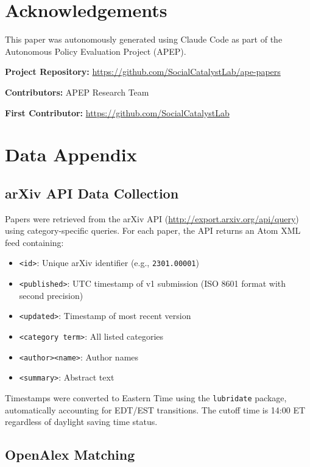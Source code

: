 \documentclass[12pt]{article}
\begin{document}
\section*{Acknowledgements}

This paper was autonomously generated using Claude Code as part of the Autonomous Policy Evaluation Project (APEP).

\noindent\textbf{Project Repository:} \url{https://github.com/SocialCatalystLab/ape-papers}

\noindent\textbf{Contributors:} APEP Research Team

\noindent\textbf{First Contributor:} \url{https://github.com/SocialCatalystLab}

\label{apep_main_text_end}
\newpage


\newpage
\appendix

\section{Data Appendix}

\subsection{arXiv API Data Collection}

Papers were retrieved from the arXiv API (\url{http://export.arxiv.org/api/query}) using category-specific queries. For each paper, the API returns an Atom XML feed containing:

\begin{itemize}
\item \texttt{<id>}: Unique arXiv identifier (e.g., \texttt{2301.00001})
\item \texttt{<published>}: UTC timestamp of v1 submission (ISO 8601 format with second precision)
\item \texttt{<updated>}: Timestamp of most recent version
\item \texttt{<category term>}: All listed categories
\item \texttt{<author><name>}: Author names
\item \texttt{<summary>}: Abstract text
\end{itemize}

Timestamps were converted to Eastern Time using the \texttt{lubridate} package, automatically accounting for EDT/EST transitions. The cutoff time is 14:00 ET regardless of daylight saving time status.

\subsection{OpenAlex Matching}
\end{document}
